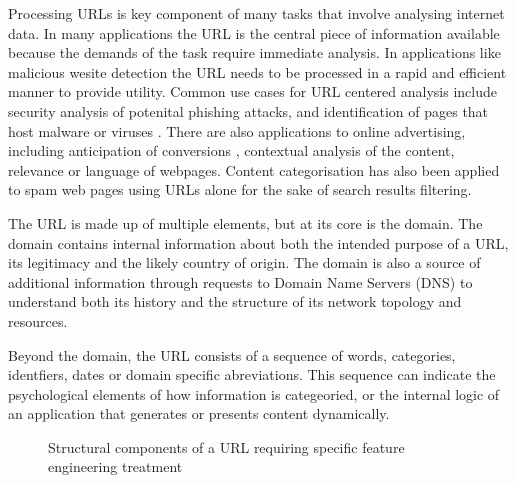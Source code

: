 \documentclass{aircc}
\begin{document}
Processing URLs is key component of many tasks that involve
analysing internet data. In many applications the URL is the central piece of 
information available because the demands of the task require immediate analysis.
In applications like malicious wesite detection the URL needs to be processed
in a rapid and efficient manner to provide utility\cite{Ma2009b}.
Common use cases for URL centered analysis include security analysis of potenital phishing 
attacks\cite{Garera2007,Basnet2012,Basnet2014,Mamun2016,Verma2017,Vazhayil2018,Tupsamudre2019,Sirigineedi2020,Li2020}, 
and identification of pages that host malware or viruses \cite{Canali2011,Mamun2016}.
There are also applications to online advertising,
including anticipation of conversions \cite{Qiu2020}, contextual analysis of
the content\cite{Kan2004,Shih2004,Baykan2009,Meshkizadeh2010,Hernandez2012,Arya2016}, relevance \cite{Kan2005} 
or language\cite{Baykan2013} of webpages. 
Content categorisation has also been applied to spam web pages using URLs alone for the sake
of search results filtering\cite{Chung2010,Hassan2008}.

The URL is made up of multiple elements, but at its core is the domain. The domain
contains internal information about both the intended purpose of a URL, its legitimacy 
and the likely country of origin. The domain is also a source of additional information 
through requests to Domain Name Servers (DNS) to understand both its history and the
structure of its network topology and resources.

Beyond the domain, the URL consists of a sequence of words, categories, identfiers, dates
or domain specific abreviations. This sequence can indicate the psychological elements of how
information is categeoried, or the internal logic of an application that generates or presents
content dynamically. 

\begin{figure}
\centering
{}
\caption{Structural components of a URL requiring specific feature engineering treatment}
\label{fig:url_structure}
\end{figure}
\end{document}
